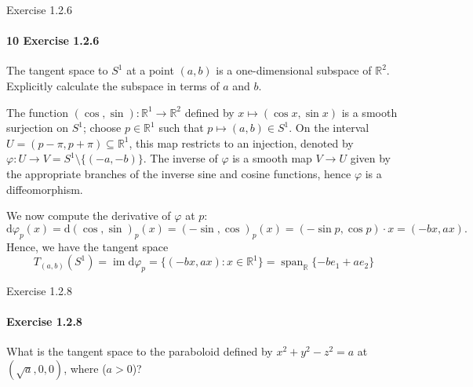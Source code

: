 \documentclass[12pt]{article}
\newlength{\myparskip}
\newenvironment{fullbox}{\begin{lrbox}{\savefullbox}\begin{minipage}{\dimexpr\textwidth-2\fboxsep\relax}\setlength{\parskip}{\myparskip}}{\end{minipage}\end{lrbox}\framebox[\textwidth]{\usebox{\savefullbox}}}
\newenvironment{pbox}[1][]{\begin{fullbox}\ifx#1\empty\else\paragraph{#1}\phantom{}\fi}{\end{fullbox}}
\theoremstyle{definition}
\newcommand{\R}{\mathbb{R}}
\renewcommand{\phi}{\varphi}
\newcommand{\<}{\langle}
\renewcommand{\>}{\rangle}
\newcommand{\seq}{\subseteq}
\DeclareMathOperator{\im}{im}
\newcommand{\dd}{\mathrm{d}}
\begin{document}
\begin{pbox}[10 Exercise 1.2.6]
    The tangent space to $S^1$ at a point $(a, b)$ is a one-dimensional subspace of $\R^2$.
    Explicitly calculate the subspace in terms of $a$ and $b$.
\end{pbox}

The function $(\cos, \sin) : \R^1 \to \R^2$ defined by $x \mapsto (\cos x, \sin x)$ is a smooth surjection on $S^1$; choose $p \in \R^1$ such that $p \mapsto (a, b) \in S^1$.
On the interval $U = (p - \pi, p + \pi) \seq \R^1$, this map restricts to an injection, denoted by $\phi : U \to V = S^1 \setminus\{(-a, -b)\}$.
The inverse of $\phi$ is a smooth map $V \to U$ given by the appropriate branches of the inverse sine and cosine functions, hence $\phi$ is a diffeomorphism.

We now compute the derivative of $\phi$ at $p$:
\[
    \dd{\phi}_{p}(x)
        = \dd(\cos, \sin)_p(x)
        = (-\sin, \cos)_p(x)
        = (-\sin p, \cos p) \cdot x
        = (-bx, ax).
\]
Hence, we have the tangent space
\[
    T_{(a, b)}(S^1)
        = \im \dd{\phi}_{p}
        = \{(-bx, ax) : x \in \R^1\}
        = \operatorname{span}_\R\{-be_1 +  ae_2\}
\]



\begin{pbox}[ Exercise 1.2.8]
    What is the tangent space to the paraboloid defined by $x^2 + y^2 - z^2 = a$ at $(\sqrt{a}, 0, 0)$, where ($a > 0$)?
\end{pbox}
\end{document}
